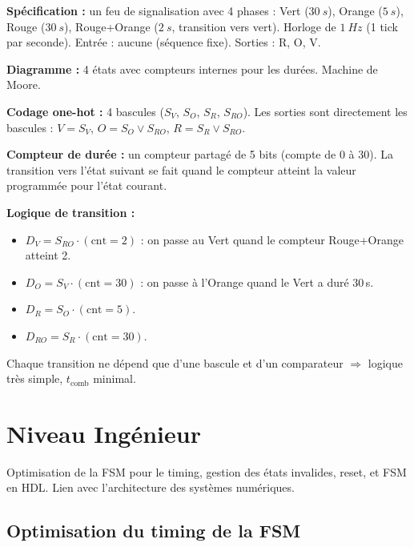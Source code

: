 \documentclass[12pt,a4paper,twoside]{book}
\begin{document}
\begin{pratique}
\textbf{Spécification :} un feu de signalisation avec 4 phases : Vert ($\SI{30}{s}$), Orange ($\SI{5}{s}$), Rouge ($\SI{30}{s}$), Rouge+Orange ($\SI{2}{s}$, transition vers vert). Horloge de $\SI{1}{Hz}$ (1 tick par seconde). Entrée : aucune (séquence fixe). Sorties : R, O, V.

\textbf{Diagramme :} 4 états avec compteurs internes pour les durées. Machine de Moore.

\textbf{Codage one-hot :} 4 bascules ($S_V$, $S_O$, $S_R$, $S_{RO}$). Les sorties sont directement les bascules : $V = S_V$, $O = S_O \lor S_{RO}$, $R = S_R \lor S_{RO}$.

\textbf{Compteur de durée :} un compteur partagé de 5 bits (compte de 0 à 30). La transition vers l'état suivant se fait quand le compteur atteint la valeur programmée pour l'état courant.

\textbf{Logique de transition :}
\begin{itemize}[nosep]
\item $D_V = S_{RO} \cdot (\text{cnt} = 2)$ : on passe au Vert quand le compteur Rouge+Orange atteint 2.
\item $D_O = S_V \cdot (\text{cnt} = 30)$ : on passe à l'Orange quand le Vert a duré 30\,s.
\item $D_R = S_O \cdot (\text{cnt} = 5)$.
\item $D_{RO} = S_R \cdot (\text{cnt} = 30)$.
\end{itemize}
Chaque transition ne dépend que d'une bascule et d'un comparateur $\Rightarrow$ logique très simple, $t_{\text{comb}}$ minimal.
\end{pratique}

\section{Niveau Ingénieur}

\begin{ingenieur}
Optimisation de la FSM pour le timing, gestion des états invalides, reset, et FSM en HDL. Lien avec l'architecture des systèmes numériques.
\end{ingenieur}

\subsection{Optimisation du timing de la FSM}
\end{document}

